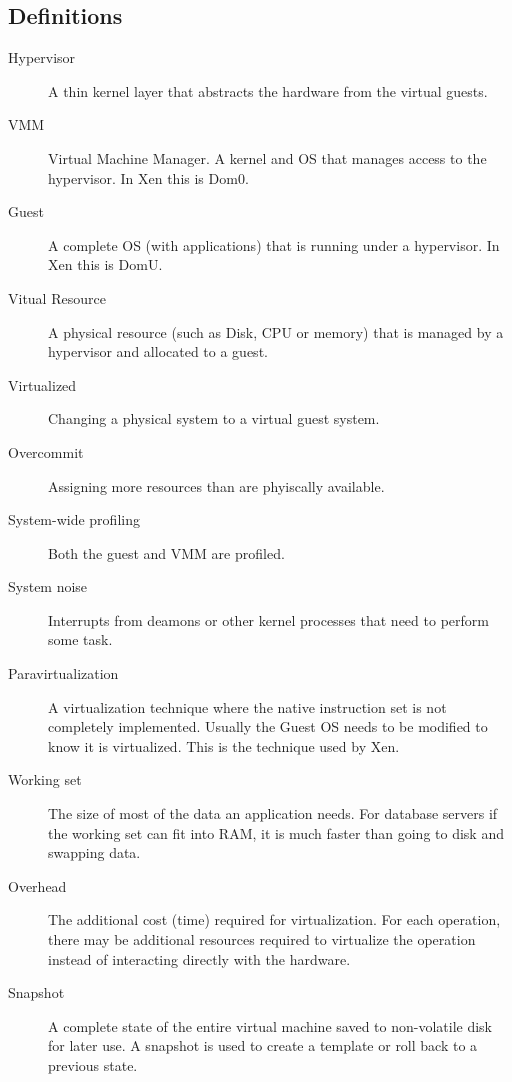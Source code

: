 \subsection{Definitions}
\begin{description}
  \item[Hypervisor] A thin kernel layer that abstracts the hardware from the virtual guests.\\
  \item[VMM] Virtual Machine Manager. A kernel and OS that manages access to the hypervisor.  In Xen this is Dom0.\\
  \item[Guest] A complete OS (with applications) that is running under a hypervisor.  In Xen this is DomU.\\
  \item[Vitual Resource]  A physical resource (such as Disk, CPU or memory) that is managed by a hypervisor and allocated to a guest.\\
  \item[Virtualized] Changing a physical system to a virtual guest system.\\
  \item[Overcommit] Assigning more resources than are phyiscally available.\\
  \item[System-wide profiling] Both the guest and VMM are profiled.\\
  \item[System noise] Interrupts from deamons or other kernel processes that need to perform some task. \cite{tsafrir}\\
  \item[Paravirtualization] A virtualization technique where the native instruction set is not completely implemented.  Usually the Guest OS needs to be modified to know it is virtualized. This is the technique used by Xen. \cite{vmwareMem, du1}
  \item[Working set] The size of most of the data an application needs.  For database servers if the working set can fit into RAM, it is much faster than going to disk and swapping data. 
  \item[Overhead] The additional cost (time) required for virtualization.  For each operation, there may be additional resources required to virtualize the operation instead of interacting directly with the hardware.
  \item[Snapshot] A complete state of the entire virtual machine saved to non-volatile disk for later use.  A snapshot is used to create a template or roll back to a previous state.
\end{description}
